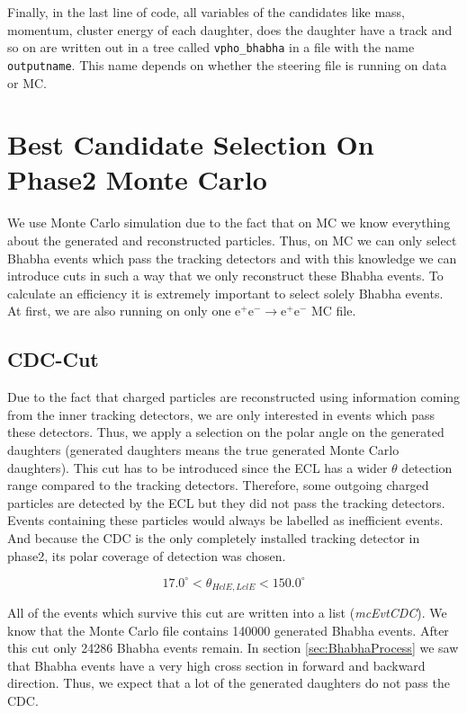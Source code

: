 \documentclass[a4paper,11pt,twosided,final,german,openbib,pdftex,listof=totoc,bibliography=totoc]{scrbook}
\begin{document}
Finally, in the last line of code, all variables of the candidates like mass, momentum, cluster energy of each daughter, does the daughter have a track and so on are written out in a tree called \texttt{vpho\_bhabha} in a file with the name \texttt{outputname}. This name depends on whether the steering file is running on data or MC.


\section{Best Candidate Selection On Phase2 Monte Carlo}
\label{sec:SelectingBhabhaMC}

We use Monte Carlo simulation due to the fact that on MC we know everything about the generated and reconstructed particles. Thus, on MC we can only select Bhabha events which pass the tracking detectors and with this knowledge we can introduce cuts in such a way that we only reconstruct these Bhabha events. To calculate an efficiency it is extremely important to select solely Bhabha events. At first, we are also running on only one $\textrm{e}^+ \textrm{e}^- \rightarrow \textrm{e}^+ \textrm{e}^-$ MC file.


\subsection{CDC-Cut}

Due to the fact that charged particles are reconstructed using information coming from the inner tracking detectors, we are only interested in events which pass these detectors. Thus, we apply a selection on the polar angle on the generated daughters (generated daughters means the true generated Monte Carlo daughters). This cut has to be introduced since the ECL has a wider $\theta$ detection range compared to the tracking detectors. Therefore, some outgoing charged particles are detected by the ECL but they did not pass the tracking detectors. Events containing these particles would always be labelled as inefficient events. And because the CDC is the only completely installed tracking detector in phase2, its polar coverage of detection was chosen.

\begin{equation}
	17.0^\circ < \theta_{HclE,LclE} < 150.0^\circ
\end{equation}

All of the events which survive this cut are written into a list (\textit{mcEvtCDC}). We know that the Monte Carlo file contains 140000 generated Bhabha events. After this cut only 24286 Bhabha events remain.
In section \ref{sec:BhabhaProcess} we saw that Bhabha events have a very high cross section in forward and backward  direction. Thus, we expect that a lot of the generated daughters do not pass the CDC. 
\newline
\end{document}
